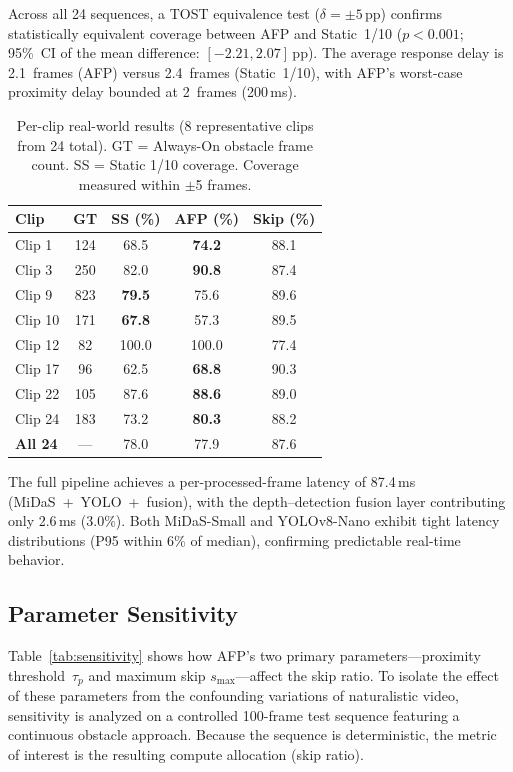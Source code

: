\documentclass[conference]{IEEEtran}
\begin{document}
Across all 24 sequences, a TOST equivalence test
($\delta{=}{\pm}5$\,pp) confirms statistically equivalent coverage
between AFP and Static~1/10 ($p < 0.001$; 95\%~CI of the mean
difference: $[-2.21, 2.07]$\,pp). The average response delay is
2.1~frames (AFP) versus 2.4~frames (Static~1/10), with AFP's
worst-case proximity delay bounded at 2~frames (200\,ms).

\begin{table}[t]
  \centering
  \caption{Per-clip real-world results (8 representative clips from
    24 total). GT = Always-On obstacle frame count. SS = Static 1/10
    coverage. Coverage measured within $\pm$5 frames.}
  \label{tab:realworld}
  \begin{tabular}{@{}lcccc@{}}
    \toprule
    \textbf{Clip} & \textbf{GT}
      & \textbf{SS (\%)} & \textbf{AFP (\%)}
      & \textbf{Skip (\%)} \\
    \midrule
    Clip 1   & 124  & 68.5 & \textbf{74.2} & 88.1 \\
    Clip 3   & 250  & 82.0 & \textbf{90.8} & 87.4 \\
    Clip 9   & 823  & \textbf{79.5} & 75.6 & 89.6 \\
    Clip 10  & 171  & \textbf{67.8} & 57.3 & 89.5 \\
    Clip 12  & 82   & 100.0 & 100.0 & 77.4 \\
    Clip 17  & 96   & 62.5 & \textbf{68.8} & 90.3 \\
    Clip 22  & 105  & 87.6 & \textbf{88.6} & 89.0 \\
    Clip 24  & 183  & 73.2 & \textbf{80.3} & 88.2 \\
    \midrule
    \textbf{All 24} & ---  & 78.0 & 77.9 & 87.6 \\
    \bottomrule
  \end{tabular}
\end{table}

The full pipeline achieves a per-processed-frame latency of
87.4\,ms (MiDaS~+~YOLO~+~fusion), with the depth--detection fusion
layer contributing only 2.6\,ms (3.0\%). Both MiDaS-Small and
YOLOv8-Nano exhibit tight latency distributions (P95 within 6\% of
median), confirming predictable real-time behavior.

\subsection{Parameter Sensitivity}

Table~\ref{tab:sensitivity} shows how AFP's two primary
parameters---proximity threshold~$\tau_p$ and maximum skip
$s_\text{max}$---affect the skip ratio. To isolate the effect of
these parameters from the confounding variations of naturalistic
video, sensitivity is analyzed on a controlled 100-frame test
sequence featuring a continuous obstacle approach. Because the
sequence is deterministic, the metric of interest is the resulting
compute allocation (skip ratio).
\end{document}
